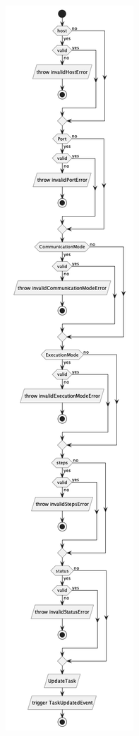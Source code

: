 \begin{figure}[H]
    \centering
    \includegraphics[height=0.5\textheight]{part/memoria_descriptiva/updateTaskUseCase}
    \caption[Diagrama de objetos de dominio]{}\label{fig:updateTaskUseCase}
\end{figure}

